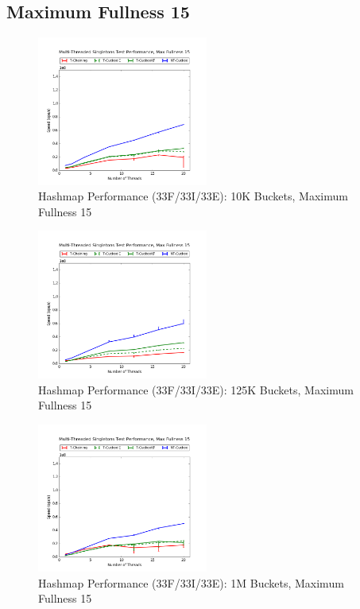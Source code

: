 \subsection{Maximum Fullness 15}

\begin{figure}[H]
    \centering
    \caption{Hashmap Performance (33F/33I/33E): 10K Buckets, Maximum Fullness 15}
    \includegraphics[width=0.5\textwidth]{maps/15HM10K:F34,I33,E33.png} 
    
\end{figure}

\begin{figure}[H]
    \centering
    \caption{Hashmap Performance (33F/33I/33E): 125K Buckets, Maximum Fullness 15}
    \includegraphics[width=0.5\textwidth]{maps/15HM125K:F34,I33,E33.png} 
    
\end{figure}

\begin{figure}[H]
    \centering
    \caption{Hashmap Performance (33F/33I/33E): 1M Buckets, Maximum Fullness 15}
    \includegraphics[width=0.5\textwidth]{maps/15HM1M:F34,I33,E33.png} 
    
\end{figure}


